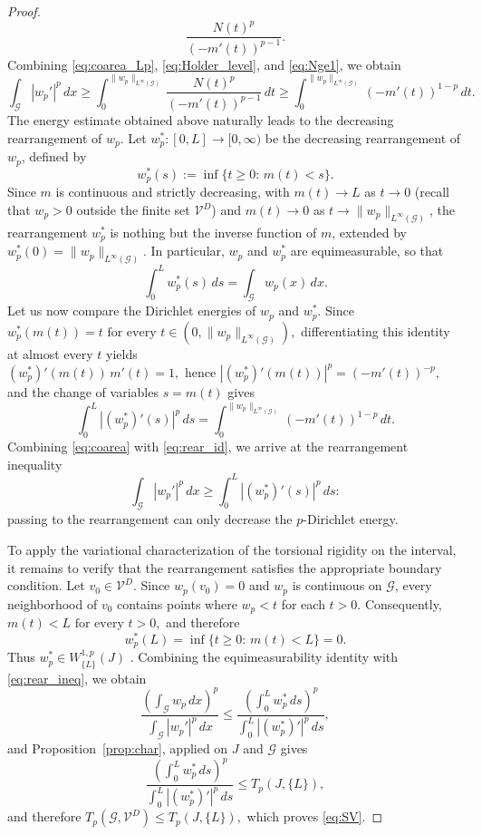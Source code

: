 \documentclass[12pt,a4paper]{article}
\numberwithin{equation}{section}
\begin{document}
\begin{proof}
\begin{equation}
		\frac{N(t)^p}
		{(-m'(t))^{p-1}}.
	\end{equation}
	Combining \eqref{eq:coarea_Lp}, \eqref{eq:Holder_level}, and
	\eqref{eq:Nge1}, we obtain
	\begin{equation}
		\label{eq:coarea}
		\int_{\mathcal G}|w_p'|^p\,dx
		\ge
		\int_0^{\|w_p\|_{L^{\infty}(\mathcal{G})}}
		\frac{N(t)^p}
		{(-m'(t))^{p-1}}
		\,dt
		\ge
		\int_0^{\|w_p\|_{L^{\infty}(\mathcal{G})}}
		(-m'(t))^{1-p}\,dt.
	\end{equation}
	The energy estimate obtained above naturally leads to the decreasing
	rearrangement of $w_p$. Let
	\(
	w_p^*:[0,L]\longrightarrow[0,\infty)
	\)
	be the decreasing rearrangement of $w_p$, defined by
	\[
	w_p^*(s)
	:=
	\inf\{t\ge0:\,m(t)<s\}.
	\]
	Since $m$ is continuous and strictly decreasing, with $m(t)\to L$ as
	$t\to0$ (recall that $w_p>0$ outside the finite set
	$\mathcal V^D$) and $m(t)\to0$ as $t\to\|w_p\|_{L^{\infty}(\mathcal{G})}$, the
	rearrangement $w_p^*$ is nothing but the inverse function of $m$,
	extended by $w_p^*(0)=\|w_p\|_{L^{\infty}(\mathcal{G})}$. In particular, $w_p$ and
	$w_p^*$ are equimeasurable, so that
	\[
	\int_0^L w_p^*(s)\,ds
	=
	\int_{\mathcal G}w_p(x)\,dx.
	\]
	Let us now compare the Dirichlet energies of $w_p$ and $w_p^*$. Since
	\(
	w_p^*(m(t))=t
\text{ for every }t\in(0,\|w_p\|_{L^{\infty}(\mathcal{G})}),
	\)
	differentiating this identity at almost every $t$ yields
	\(
	(w_p^*)'(m(t))\,m'(t)=1,
\text{ hence }
	|(w_p^*)'(m(t))|^p
	=
	(-m'(t))^{-p},
	\)
	and the change of variables $s=m(t)$  gives
	\begin{equation}
		\label{eq:rear_id}
		\int_0^L |(w_p^*)'(s)|^p\,ds
		=
		\int_0^{\|w_p\|_{L^{\infty}(\mathcal{G})}}
		(-m'(t))^{1-p}\,dt.
	\end{equation}
	Combining \eqref{eq:coarea} with \eqref{eq:rear_id}, we arrive at the
	rearrangement inequality
	\begin{equation}
		\label{eq:rear_ineq}
		\int_{\mathcal G}|w_p'|^p\,dx
		\ge
		\int_0^L |(w_p^*)'(s)|^p\,ds:
	\end{equation}
	passing to the rearrangement can only decrease the $p$-Dirichlet
	energy.
	
	To apply the variational characterization of the torsional rigidity on
	the interval, it remains to verify that the rearrangement satisfies
	the appropriate boundary condition. Let $v_0\in\mathcal{V}^D$. Since
	$w_p(v_0)=0$ and $w_p$ is continuous on $\mathcal G$, every
	neighborhood of $v_0$ contains points where $w_p<t$ for each $t>0$.
	Consequently,
	\(
	m(t)<L
\text{ for every }t>0,
	\)
	and therefore
	\[
	w_p^*(L)
	=
	\inf\{t\ge0:\,m(t)<L\}
	=
	0.
	\]
	Thus $w_p^*\in W^{1,p}_{\{L\}}(J)$ .
 Combining the equimeasurability
	identity with \eqref{eq:rear_ineq}, we obtain
	\[
	\frac{\left(\int_{\mathcal G}w_p\,dx\right)^p}
	{\int_{\mathcal G}|w_p'|^p\,dx}
	\le
	\frac{\left(\int_0^L w_p^*\,ds\right)^p}
	{\int_0^L |(w_p^*)'|^p\,ds},
	\]
	and Proposition~\ref{prop:char}, applied on $J$ and $\mathcal{G}$ gives
	\[
	\frac{\left(\int_0^L w_p^*\,ds\right)^p}
	{\int_0^L |(w_p^*)'|^p\,ds}
	\le
	T_p(J,\{L\}),
	\]
	and therefore
	\(
	T_p(\mathcal G,\mathcal{V}^D)
	\le
	T_p(J,\{L\}),
	\)
	which proves \eqref{eq:SV}.
	

\end{proof}
\end{document}
